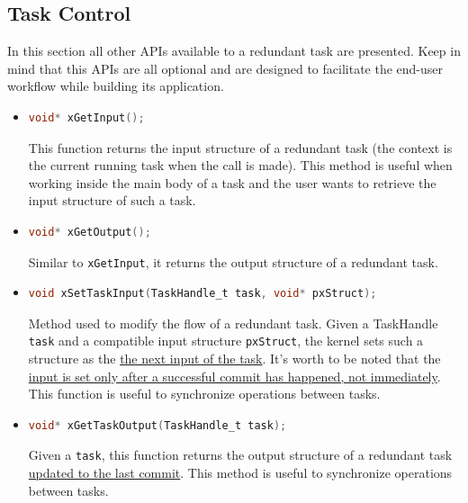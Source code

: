 \documentclass[a4paper, 12pt]{article}
\begin{document}
\begin{onehalfspace}
\subsection{Task Control}
In this section all other APIs available to a redundant task are presented. Keep in mind that this APIs are all optional and are designed to facilitate the end-user workflow while building its application.
\begin{itemize}
    \item {
    \begin{lstlisting}[language=C]
void* xGetInput();
        \end{lstlisting}
        This function returns the input structure of a redundant task (the context is the current running task when the call is made). This method is useful when working inside the main body of a task and the user wants to retrieve the input structure of such a task.
    }
    \item {
    \begin{lstlisting}[language=C]
void* xGetOutput();
        \end{lstlisting}
        Similar to \texttt{xGetInput}, it returns the output structure of a redundant task. 
    }
    \item \label{external_input}{
    \begin{lstlisting}[language=C]
void xSetTaskInput(TaskHandle_t task, void* pxStruct);
        \end{lstlisting}
        Method used to modify the flow of a redundant task. Given a TaskHandle \texttt{task} and a compatible input structure \texttt{pxStruct}, the kernel sets such a structure as the \underline{the next input of the task}. It's worth to be noted that the \underline{input is set only after a successful commit has happened, not immediately}. This function is useful to synchronize operations between tasks.
    }
    \item {
    \begin{lstlisting}[language=C]
void* xGetTaskOutput(TaskHandle_t task);
        \end{lstlisting}
        Given a \texttt{task}, this function returns the output structure of a redundant task \underline{updated to the last commit}. This method is useful to synchronize operations between tasks.
    }
\end{itemize}

\end{onehalfspace}
\end{document}
